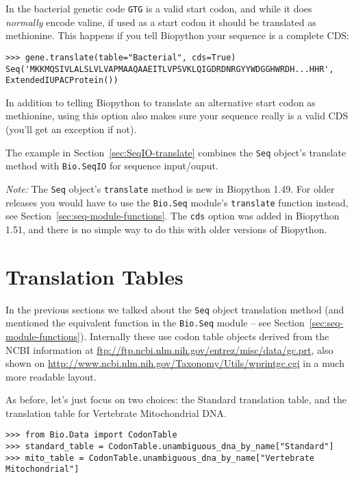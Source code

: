 \documentclass{report}
\begin{document}
\noindent In the bacterial genetic code \texttt{GTG} is a valid start codon,
and while it does \emph{normally} encode valine, if used as a start codon it
should be translated as methionine. This happens if you tell Biopython your
sequence is a complete CDS:

\begin{verbatim}
>>> gene.translate(table="Bacterial", cds=True)
Seq('MKKMQSIVLALSLVLVAPMAAQAAEITLVPSVKLQIGDRDNRGYYWDGGHWRDH...HHR',
ExtendedIUPACProtein())
\end{verbatim}

In addition to telling Biopython to translate an alternative start codon as
methionine, using this option also makes sure your sequence really is a valid
CDS (you'll get an exception if not).

The example in Section~\ref{sec:SeqIO-translate} combines the \verb|Seq| object's
translate method with \verb|Bio.SeqIO| for sequence input/ouput.

\emph{Note:} The \verb|Seq| object's \verb|translate| method is new in Biopython 1.49.
For older releases you would have to use the \verb|Bio.Seq| module's \verb|translate|
function instead, see Section~\ref{sec:seq-module-functions}. The \texttt{cds} option
was added in Biopython 1.51, and there is no simple way to do this with older versions
of Biopython.

\section{Translation Tables}

In the previous sections we talked about the \verb|Seq| object translation method (and mentioned the equivalent function in the \verb|Bio.Seq| module -- see
Section~\ref{sec:seq-module-functions}).
Internally these use codon table objects derived from the NCBI information at
\url{ftp://ftp.ncbi.nlm.nih.gov/entrez/misc/data/gc.prt}, also shown on
\url{http://www.ncbi.nlm.nih.gov/Taxonomy/Utils/wprintgc.cgi} in a much more readable layout.

As before, let's just focus on two choices: the Standard translation table, and the
translation table for Vertebrate Mitochondrial DNA. 

\begin{verbatim}
>>> from Bio.Data import CodonTable
>>> standard_table = CodonTable.unambiguous_dna_by_name["Standard"]
>>> mito_table = CodonTable.unambiguous_dna_by_name["Vertebrate Mitochondrial"]
\end{verbatim}
\end{document}
